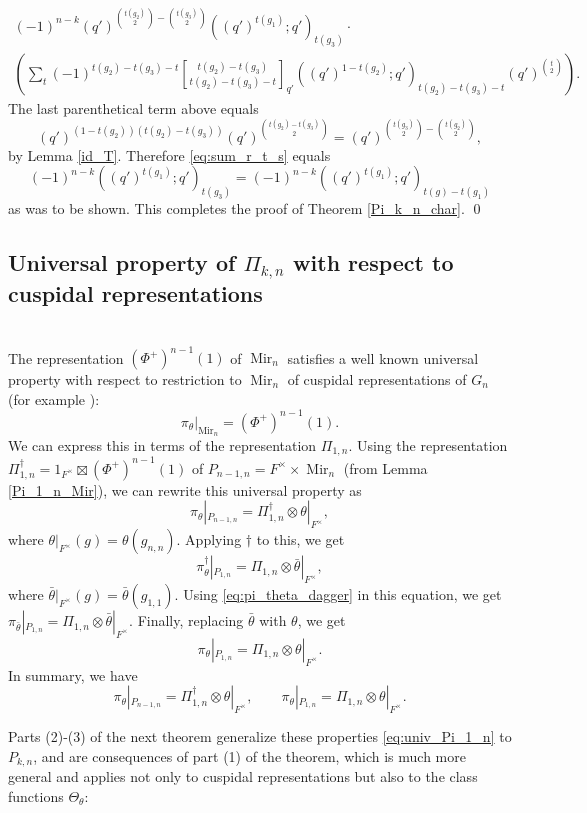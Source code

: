 \documentclass[reqno]{amsart}
\theoremstyle{definition}
\theoremstyle{remark}
\numberwithin{equation}{section}
\newcommand{\stirling}[2]{\genfrac{[}{]}{0pt}{1}{#1}{#2}}
\DeclareMathOperator{\Mir}{Mir}
\begin{document}
{{\begin{multline*}
    (-1)^{n-k}  (q')^{\binom{t(g_2)}{2} - \binom{t(g_3)} {2}} ((q')^{t(g_1)}; q')_{t(g_3)} \cdot \\  \left(  \sum_t (-1)^{t(g_2)-t(g_3)-t}  \stirling{t(g_2)-t(g_3)}{t(g_2)-t(g_3)-t}_{q'}  ((q')^{1-t(g_2)};q')_{t(g_2)-t(g_3)-t} (q')^{\binom{t}{2}}\right).  \end{multline*}
The last parenthetical term above equals 
\[(q')^{(1-t(g_2))(t(g_2)-t(g_3))} (q')^{\binom{t(g_2)-t(g_3)}{2}} = (q')^{\binom{t(g_3)}{2} - \binom{t(g_2)} {2}}, \]
by Lemma \ref{id_T}. Therefore  \eqref{eq:sum_r_t_s} equals
\[  (-1)^{n-k} ((q')^{t(g_1)};q')_{t(g_3)}= (-1)^{n-k} ((q')^{t(g_1)};q')_{t(g)-t(g_1)} \]
as was to be shown. This completes the proof of Theorem \ref{Pi_k_n_char}. 
\qed

\subsection{Universal property of $\Pi_{k,n}$ with respect to cuspidal representations} \hfill \\   The representation $(\Phi^+)^{n-1}(1)$ of  $\Mir_n$  satisfies a well known universal property with respect to restriction to $\Mir_n$ of cuspidal representations of $G_n$ (for example \cite[5.18]{BerZel[2]}): 
\[ \pi_\theta|_{\Mir_n}= (\Phi^+)^{n-1}(1) .\] We can express this in terms of the representation $\Pi_{1,n}$. Using  the representation $\Pi_{1,n}^\dagger = 1_{F^\times} \boxtimes (\Phi^+)^{n-1}(1)$ of $P_{n-1,n}=F^\times  \times \Mir_n$ (from Lemma \ref{Pi_1_n_Mir}), we can rewrite this universal property as 
\[ \pi_\theta|_{P_{n-1,n}}=  \Pi_{1,n}^\dagger \otimes \theta|_{F^\times},\]
where  $\theta|_{F^\times}(g)=\theta(g_{n,n})$.
Applying $\dagger$ to this, we get 
\[ \pi_\theta^\dagger| _{P_{1,n}}= \Pi_{1,n} \otimes \bar\theta|_{F^\times}  ,\]
where $\bar\theta|_{F^\times}(g)=\bar\theta(g_{1,1})$. Using  \eqref{eq:pi_theta_dagger} in this equation,  we get $\pi_{\bar \theta} |_{P_{1,n}}= \Pi_{1,n} \otimes \bar \theta|_{F^\times}$. Finally, replacing $\bar\theta$ with $\theta$, we get 
\[     \pi_{\theta} |_{P_{1,n}}= \Pi_{1,n} \otimes  \theta|_{F^\times}.\]
In summary, we have 
\begin{equation} \label{eq:univ_Pi_1_n}
   \pi_\theta|_{P_{n-1,n}}=  \Pi_{1,n}^\dagger \otimes \theta|_{F^\times}, \qquad \pi_{\theta} |_{P_{1,n}}= \Pi_{1,n} \otimes  \theta|_{F^\times}.
 \end{equation}

Parts (2)-(3) of the  next theorem generalize these properties \eqref{eq:univ_Pi_1_n} to $P_{k,n}$, and are consequences of part (1) of the theorem, which is much more general and applies not only to cuspidal representations but also to the class functions $\Theta_\theta$:


}}
\end{document}
